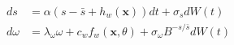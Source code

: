 \begin{align}
    ds &= \alpha(s-\bar{s}+h_w(\mathbf x)) dt + \sigma_s dW(t) \\
    d\omega &= \lambda_\omega \omega + c_w f_w(\mathbf x,\theta) + \sigma_\omega B^{-s/\bar{s}} dW(t)
\end{align}